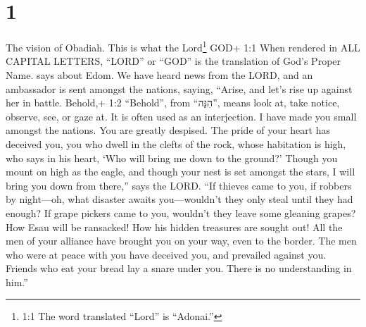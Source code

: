 \hypertarget{section}{%
\section{1}\label{section}}

 The vision of Obadiah. This is what the Lord\footnote{1:1
  The word translated ``Lord'' is ``Adonai.''} GOD+ 1:1 When rendered in
ALL CAPITAL LETTERS, ``LORD'' or ``GOD'' is the translation of God's
Proper Name. says about Edom. We have heard news from the LORD, and an
ambassador is sent amongst the nations, saying, ``Arise, and let's rise
up against her in battle.  Behold,+ 1:2 ``Behold'', from
``הִנֵּה'', means look at, take notice, observe, see, or gaze at. It is
often used as an interjection. I have made you small amongst the
nations. You are greatly despised.  The pride of your heart
has deceived you, you who dwell in the clefts of the rock, whose
habitation is high, who says in his heart, `Who will bring me down to
the ground?'  Though you mount on high as the eagle, and
though your nest is set amongst the stars, I will bring you down from
there,'' says the LORD.  ``If thieves came to you, if
robbers by night---oh, what disaster awaits you---wouldn't they only
steal until they had enough? If grape pickers came to you, wouldn't they
leave some gleaning grapes?  How Esau will be ransacked! How
his hidden treasures are sought out!  All the men of your
alliance have brought you on your way, even to the border. The men who
were at peace with you have deceived you, and prevailed against you.
Friends who eat your bread lay a snare under you. There is no
understanding in him.''

